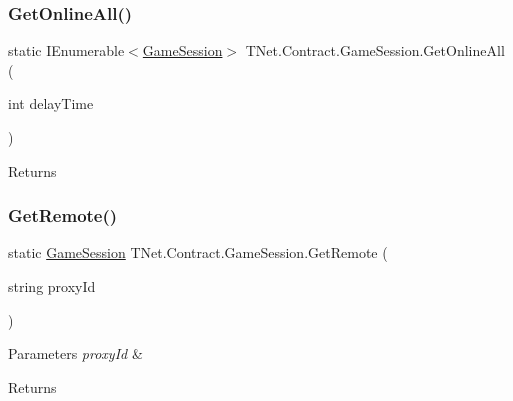 \subsubsection{\texorpdfstring{Get\+Online\+All()}{GetOnlineAll()}\hspace{0.1cm}{\footnotesize\ttfamily [2/2]}}
{\footnotesize\ttfamily static I\+Enumerable$<$\mbox{\hyperlink{class_t_net_1_1_contract_1_1_game_session}{Game\+Session}}$>$ T\+Net.\+Contract.\+Game\+Session.\+Get\+Online\+All (\begin{DoxyParamCaption}\item[{int}]{delay\+Time }\end{DoxyParamCaption})\hspace{0.3cm}{\ttfamily [static]}}





\begin{DoxyReturn}{Returns}

\end{DoxyReturn}
\mbox{\label{class_t_net_1_1_contract_1_1_game_session_ab8b4c73cc5f7eac0d342961fc786566f}} 
\subsubsection{\texorpdfstring{Get\+Remote()}{GetRemote()}}
{\footnotesize\ttfamily static \mbox{\hyperlink{class_t_net_1_1_contract_1_1_game_session}{Game\+Session}} T\+Net.\+Contract.\+Game\+Session.\+Get\+Remote (\begin{DoxyParamCaption}\item[{string}]{proxy\+Id }\end{DoxyParamCaption})\hspace{0.3cm}{\ttfamily [static]}}






\begin{DoxyParams}{Parameters}
{\em proxy\+Id} & \\
\hline
\end{DoxyParams}
\begin{DoxyReturn}{Returns}

\end{DoxyReturn}
\mbox{\label{class_t_net_1_1_contract_1_1_game_session_a5f5c60f6e01d8a088c49052bc3e15d4c}} 
